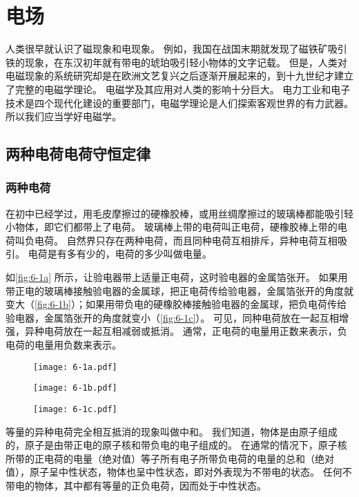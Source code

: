 \chapter{电场}\label{chp:electric_field}
人类很早就认识了磁现象和电现象。
例如，我国在战国末期就发现了磁铁矿吸引铁的现象，在东汉初年就有带电的琥珀吸引轻小物体的文字记载。
但是，人类对电磁现象的系统研究却是在欧洲文艺复兴之后逐渐开展起来的，到十九世纪才建立了完整的电磁学理论。
电磁学及其应用对人类的影响十分巨大。
电力工业和电子技术是四个现代化建设的重要部门，电磁学理论是人们探索客观世界的有力武器。
所以我们应当学好电磁学。

\section{两种电荷\texorpdfstring{\quad}{ }电荷守恒定律}
\subsection{两种电荷} 
在初中已经学过，用毛皮摩擦过的硬橡胶棒，或用丝绸摩擦过的玻璃棒都能吸引轻小物体，即它们都带上了电荷。
玻璃棒上带的电荷叫正电荷，硬橡胶棒上带的电荷叫负电荷。
自然界只存在两种电荷，而且同种电荷互相排斥，异种电荷互相吸引。
电荷是有多有少的，电荷的多少叫做电量。

如\cref{fig:6-1a} 所示，让验电器带上适量正电荷，这时验电器的金属箔张开。
如果用带正电的玻璃棒接触验电器的金属球，把正电荷传给验电器，金属箔张开的角度就变大（\cref{fig:6-1b}）；如果用带负电的硬橡胶棒接触验电器的金属球，把负电荷传给验电器，金属箔张开的角度就变小（\cref{fig:6-1c}）。
可见，同种电荷放在一起互相增强，异种电荷放在一起互相减弱或抵消。
通常，正电荷的电量用正数来表示，负电荷的电量用负数来表示。

\begin{figure}
	\begin{minipage}{0.3\linewidth}\centering
		\texttt{[image: 6-1a.pdf]}
		\subcaption{}\label{fig:6-1a}
	\end{minipage}
	\begin{minipage}{0.3\linewidth}\centering
		\texttt{[image: 6-1b.pdf]}
		\subcaption{}\label{fig:6-1b}
	\end{minipage}
	\begin{minipage}{0.3\linewidth}\centering
		\texttt{[image: 6-1c.pdf]}
		\subcaption{}\label{fig:6-1c}
	\end{minipage}
	\caption{}\label{fig:6-1}
\end{figure}

等量的异种电荷完全相互抵消的现象叫做中和。
我们知道，物体是由原子组成的，原子是由带正电的原子核和带负电的电子组成的。
在通常的情况下，原子核所带的正电荷的电量（绝对值）等子所有电子所带负电荷的电量的总和（绝对值），原子呈中性状态，物体也呈中性状态，即对外表现为不带电的状态。
任何不带电的物体，其中都有等量的正负电荷，因而处于中性状态。

